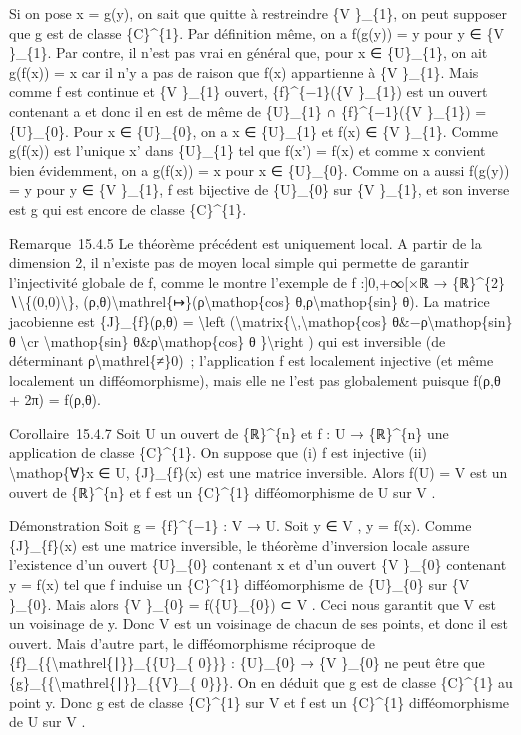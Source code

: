 \documentclass[]{article}
\begin{document}
Si on pose x = g(y), on sait que quitte à restreindre \{V \}\_\{1\}, on
peut supposer que g est de classe \{C\}\^{}\{1\}. Par définition même,
on a f(g(y)) = y pour y ∈ \{V \}\_\{1\}. Par contre, il n'est pas vrai
en général que, pour x ∈ \{U\}\_\{1\}, on ait g(f(x)) = x car il n'y a
pas de raison que f(x) appartienne à \{V \}\_\{1\}. Mais comme f est
continue et \{V \}\_\{1\} ouvert, \{f\}\^{}\{−1\}(\{V \}\_\{1\}) est un
ouvert contenant a et donc il en est de même de \{U\}\_\{1\} ∩
\{f\}\^{}\{−1\}(\{V \}\_\{1\}) = \{U\}\_\{0\}. Pour x ∈ \{U\}\_\{0\}, on
a x ∈ \{U\}\_\{1\} et f(x) ∈ \{V \}\_\{1\}. Comme g(f(x)) est l'unique
x' dans \{U\}\_\{1\} tel que f(x') = f(x) et comme x convient bien
évidemment, on a g(f(x)) = x pour x ∈ \{U\}\_\{0\}. Comme on a aussi
f(g(y)) = y pour y ∈ \{V \}\_\{1\}, f est bijective de \{U\}\_\{0\} sur
\{V \}\_\{1\}, et son inverse est g qui est encore de classe
\{C\}\^{}\{1\}.

Remarque~15.4.5 Le théorème précédent est uniquement local. A partir de
la dimension 2, il n'existe pas de moyen local simple qui permette de
garantir l'injectivité globale de f, comme le montre l'exemple de f
:{]}0,+∞{[}×ℝ → \{ℝ\}\^{}\{2\}
∖\textbackslash{}\{(0,0)\textbackslash{}\},
(ρ,θ)\textbackslash{}mathrel\{↦\}(ρ\textbackslash{}mathop\{cos\}
θ,ρ\textbackslash{}mathop\{sin\} θ). La matrice jacobienne est
\{J\}\_\{f\}(ρ,θ) = \textbackslash{}left
(\textbackslash{}matrix\{\textbackslash{},\textbackslash{}mathop\{cos\}
θ\&−ρ\textbackslash{}mathop\{sin\} θ \textbackslash{}cr
\textbackslash{}mathop\{sin\} θ\&ρ\textbackslash{}mathop\{cos\} θ
\}\textbackslash{}right ) qui est inversible (de déterminant
ρ\textbackslash{}mathrel\{≠\}0)~; l'application f est localement
injective (et même localement un difféomorphisme), mais elle ne l'est
pas globalement puisque f(ρ,θ + 2π) = f(ρ,θ).

Corollaire~15.4.7 Soit U un ouvert de \{ℝ\}\^{}\{n\} et f : U →
\{ℝ\}\^{}\{n\} une application de classe \{C\}\^{}\{1\}. On suppose que
(i) f est injective (ii) \textbackslash{}mathop\{∀\}x ∈ U,
\{J\}\_\{f\}(x) est une matrice inversible. Alors f(U) = V est un ouvert
de \{ℝ\}\^{}\{n\} et f est un \{C\}\^{}\{1\} difféomorphisme de U sur V
.

Démonstration Soit g = \{f\}\^{}\{−1\} : V → U. Soit y ∈ V , y = f(x).
Comme \{J\}\_\{f\}(x) est une matrice inversible, le théorème
d'inversion locale assure l'existence d'un ouvert \{U\}\_\{0\} contenant
x et d'un ouvert \{V \}\_\{0\} contenant y = f(x) tel que f induise un
\{C\}\^{}\{1\} difféomorphisme de \{U\}\_\{0\} sur \{V \}\_\{0\}. Mais
alors \{V \}\_\{0\} = f(\{U\}\_\{0\}) ⊂ V . Ceci nous garantit que V est
un voisinage de y. Donc V est un voisinage de chacun de ses points, et
donc il est ouvert. Mais d'autre part, le difféomorphisme réciproque de
\{f\}\_\{\{\textbackslash{}mathrel\{∣\}\}\_\{\{U\}\_\{ 0\}\}\} :
\{U\}\_\{0\} → \{V \}\_\{0\} ne peut être que
\{g\}\_\{\{\textbackslash{}mathrel\{∣\}\}\_\{\{V\}\_\{ 0\}\}\}. On en
déduit que g est de classe \{C\}\^{}\{1\} au point y. Donc g est de
classe \{C\}\^{}\{1\} sur V et f est un \{C\}\^{}\{1\} difféomorphisme
de U sur V .
\end{document}

